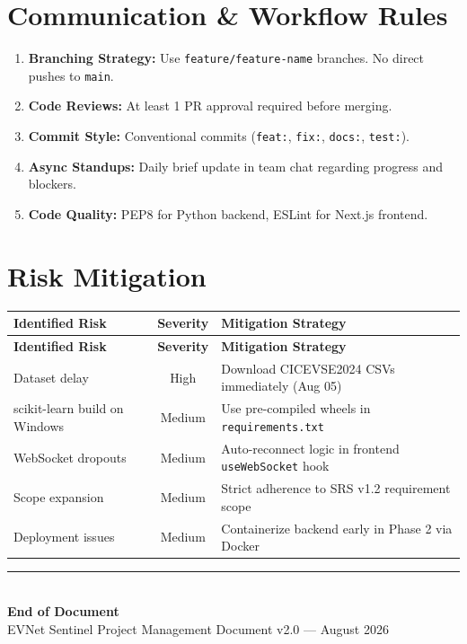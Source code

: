 \documentclass[11pt, a4paper]{article}
\begin{document}
\section{Communication \& Workflow Rules}
\label{sec:workflow}

\begin{infobox}
\small
\begin{enumerate}[nosep]
    \item \textbf{Branching Strategy:} Use \texttt{feature/feature-name} branches. No direct pushes to \texttt{main}.
    \item \textbf{Code Reviews:} At least 1 PR approval required before merging.
    \item \textbf{Commit Style:} Conventional commits (\texttt{feat:}, \texttt{fix:}, \texttt{docs:}, \texttt{test:}).
    \item \textbf{Async Standups:} Daily brief update in team chat regarding progress and blockers.
    \item \textbf{Code Quality:} PEP8 for Python backend, ESLint for Next.js frontend.
\end{enumerate}
\end{infobox}

\section{Risk Mitigation}
\label{sec:risk}

\small
\begin{longtable}{|p{}|c|p{}|}
\hline
\rowcolor{danger!10}
\textbf{Identified Risk} & \textbf{Severity} & \textbf{Mitigation Strategy} \\
\hline
\endfirsthead
\hline
\rowcolor{danger!10}
\textbf{Identified Risk} & \textbf{Severity} & \textbf{Mitigation Strategy} \\
\hline
\endhead
Dataset delay & High & Download CICEVSE2024 CSVs immediately (Aug 05) \\
scikit-learn build on Windows & Medium & Use pre-compiled wheels in \texttt{requirements.txt} \\
WebSocket dropouts & Medium & Auto-reconnect logic in frontend \texttt{useWebSocket} hook \\
Scope expansion & Medium & Strict adherence to SRS v1.2 requirement scope \\
Deployment issues & Medium & Containerize backend early in Phase 2 via Docker \\
\hline
\end{longtable}
\normalsize

\vfill
\begin{center}
\textcolor{primary}{\rule{0.5\textwidth}{1pt}}\\[0.5em]
{\large\textbf{End of Document}}\\[0.3em]
{\small EVNet Sentinel Project Management Document v2.0 — August 2026}
\end{center}
\end{document}
